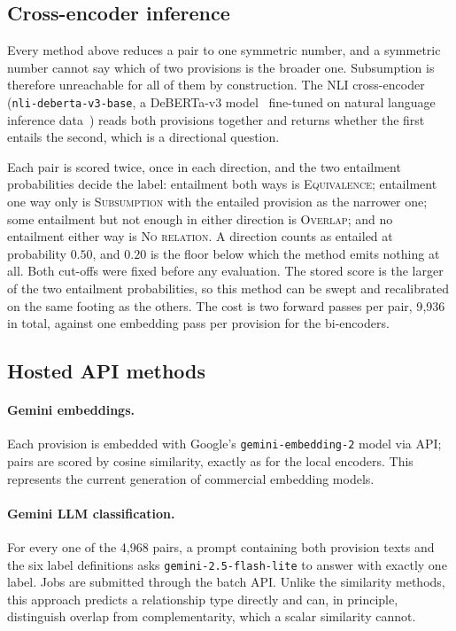 \subsection{Cross-encoder inference}\label{sec:nlimethod}

Every method above reduces a pair to one symmetric number, and a symmetric
number cannot say which of two provisions is the broader one. Subsumption is
therefore unreachable for all of them by construction. The
NLI cross-encoder (\texttt{nli-deberta-v3-base}, a DeBERTa-v3
model~\cite{he2023debertav3} fine-tuned on natural language inference
data~\cite{williams2018mnli}) reads both provisions together and returns
whether the first entails the second, which is a directional question.

Each pair is scored twice, once in each direction, and the two entailment
probabilities decide the label: entailment both ways is
\textsc{Equivalence}; entailment one way only is \textsc{Subsumption} with the
entailed provision as the narrower one; some entailment but not enough in
either direction is \textsc{Overlap}; and no entailment either way is
\textsc{No relation}. A direction counts as entailed at probability $0.50$, and
$0.20$ is the floor below which the method emits nothing at all. Both cut-offs
were fixed before any evaluation. The stored score is the larger of the two
entailment probabilities, so this method can be swept and recalibrated on the
same footing as the others. The cost is two forward passes per pair, 9{,}936 in
total, against one embedding pass per provision for the bi-encoders.

\subsection{Hosted API methods}

\paragraph{Gemini embeddings.} Each provision is embedded with Google's
\texttt{gemini-embedding-2} model via API; pairs are scored by cosine
similarity, exactly as for the local encoders. This represents the current
generation of commercial embedding models.

\paragraph{Gemini LLM classification.} For every one of the 4{,}968 pairs, a
prompt containing both provision texts and the six label definitions asks
\texttt{gemini-2.5-flash-lite} to answer with exactly one label. Jobs are
submitted through the batch API. Unlike the similarity methods, this approach
predicts a relationship type directly and can, in principle, distinguish
overlap from complementarity, which a scalar similarity cannot.


